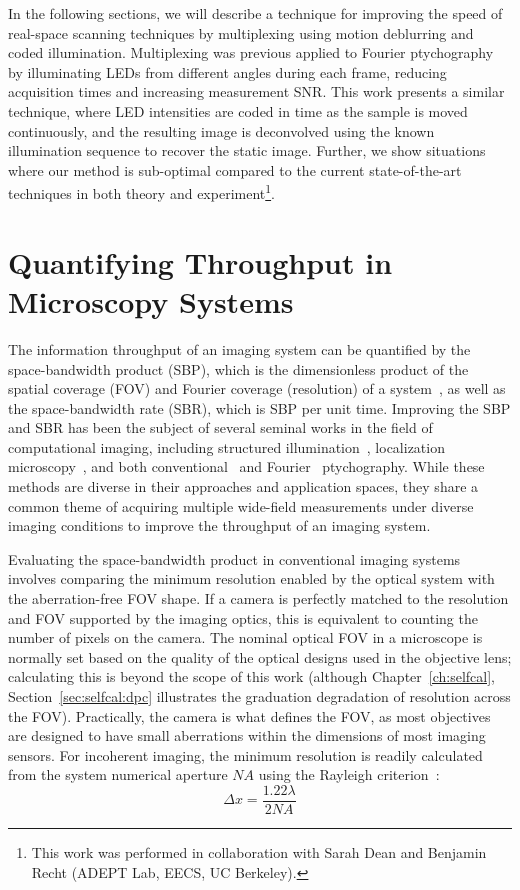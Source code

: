In the following sections, we will describe a technique for improving the speed of real-space scanning techniques by multiplexing using motion deblurring and coded illumination. Multiplexing was previous applied to Fourier ptychography~\cite{Tian2014} by illuminating LEDs from different angles during each frame, reducing acquisition times and increasing measurement SNR. This work presents a similar technique, where LED intensities are coded in time as the sample is moved continuously, and the resulting image is deconvolved using the known illumination sequence to recover the static image. Further, we show situations where our method is sub-optimal compared to the current state-of-the-art techniques in both theory and experiment\footnote{This work was performed in collaboration with Sarah Dean and Benjamin Recht (ADEPT Lab, EECS, UC Berkeley).}.

\section{Quantifying Throughput in Microscopy Systems}
The information throughput of an imaging system can be quantified by the space-bandwidth product (SBP), which is the dimensionless product of the spatial coverage (FOV) and Fourier coverage (resolution) of a system~\cite{Lohmann1996space}, as well as the space-bandwidth rate (SBR), which is SBP per unit time. Improving the SBP and SBR has been the subject of several seminal works in the field of computational imaging, including structured illumination~\cite{gustafsson2000surpassing}, localization microscopy~\cite{Rust:06, betzig2006imaging}, and both conventional~\cite{rodenburg2004phase} and Fourier~\cite{Zheng2013,tian2015computational,Tian2014} ptychography. While these methods are diverse in their approaches and application spaces, they share a common theme of acquiring multiple wide-field measurements under diverse imaging conditions to improve the throughput of an imaging system.

Evaluating the space-bandwidth product in conventional imaging systems involves comparing the minimum resolution enabled by the optical system with the aberration-free FOV shape. If a camera is perfectly matched to the resolution and FOV supported by the imaging optics, this is equivalent to counting the number of pixels on the camera. The nominal optical FOV in a microscope is normally set based on the quality of the optical designs used in the objective lens; calculating this is beyond the scope of this work (although Chapter~\ref{ch:selfcal}, Section~\ref{sec:selfcal:dpc} illustrates the graduation degradation of resolution across the FOV). Practically, the camera is what defines the FOV, as most objectives are designed to have small aberrations within the dimensions of most imaging sensors. For incoherent imaging, the minimum resolution is readily calculated from the system numerical aperture $NA$ using the Rayleigh criterion~\cite{rayleigh1896xv}:
\begin{equation}\label{eq:highthtoughput_rayleigh}
    \Delta x = \frac{1.22 \lambda}{2NA}
\end{equation}

